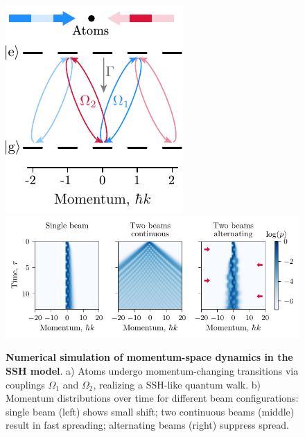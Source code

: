\begin{figure}[htb]
    \centering
    \includegraphics{fig-ai/ssh-scheme.pdf}
    \hfill
    \includegraphics{fig-py/ssh-model.pdf}
    \caption{
        \textbf{Numerical simulation of momentum-space dynamics in the SSH model}. 
        a) Atoms undergo momentum-changing transitions via couplings $\Omega_1$ and $\Omega_2$, realizing a SSH-like quantum walk.
        b) Momentum distributions over time for different beam configurations: single beam (left) shows small shift; two continuous beams (middle) result in fast spreading; alternating beams (right) suppress spread.
    }
    \label{fig:sshmodel}
\end{figure}


